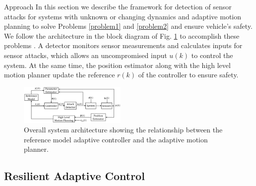 
\begin{section}{Approach}
\label{sec:approach}
In this section we describe the framework for detection of sensor attacks for systems with unknown or changing dynamics and adaptive motion planning to solve Problems \ref{problem1} and \ref{problem2} and ensure vehicle's safety. We follow the architecture in the block diagram of Fig. \ref{fig:system_arch} to accomplish these problems . A detector monitors sensor measurements and calculates inputs for sensor attacks, which allows an uncompromised input $u(k)$ to control the system. At the same time, the position estimator along with the high level motion planner update the reference $r(k)$ of the controller to ensure safety.

\begin{figure}[ht!]
\vspace{1pt}
\centering
\includegraphics[width=0.46\textwidth]{sys_arch.png}
\caption{Overall system architecture showing the relationship between the reference model adaptive controller and the adaptive motion planner.}
\label{fig:system_arch}
\end{figure}

\subsection{Resilient Adaptive Control}
\label{sec:Res_adapt_control}


\end{section}
